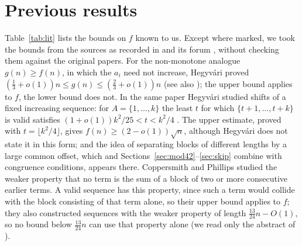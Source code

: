 \documentclass[11pt]{amsart}
\theoremstyle{remark}
\begin{document}
\section{Previous results}\label{sec:previous}

Table~\ref{tab:lit} lists the bounds on $f$ known to us. Except where marked, we took the bounds from the sources as recorded in
\cite{EP357} and its forum \cite{EP357forum}, without checking them against the original papers. For the non-monotone analogue
$g(n)\ge f(n)$, in which the $a_i$ need not increase, Hegyv\'ari \cite[Theorem~1]{Hegyvari1986} proved
$(\frac13+o(1))n\le g(n)\le(\frac23+o(1))n$ (see also \cite{Beker2024,Konieczny2021}); the upper bound applies to $f$, the lower bound
does not. In the same paper Hegyv\'ari studied shifts of a fixed increasing sequence: for $A=\{1,\dots,k\}$ the least $t$ for which
$\{t+1,\dots,t+k\}$ is valid satisfies $(1+o(1))k^2/25<t<k^2/4$ \cite[Theorem~2]{Hegyvari1986}. The upper estimate, proved with
$t=\lfloor k^2/4\rfloor$, gives $f(n)\ge(2-o(1))\sqrt n$, although Hegyv\'ari does not state it in this form; and the idea of separating
blocks of different lengths by a large common offset, which \cite{Pickhardt2026} and Sections~\ref{sec:mod42}--\ref{sec:skip} combine
with congruence conditions, appears there. Coppersmith and Phillips \cite{CoppersmithPhillips1996} studied the weaker property that no term
is the sum of a block of two or more consecutive earlier terms. A valid sequence has this property, since such a term would collide with the
block consisting of that term alone, so their upper bound applies to $f$; they also constructed sequences with the weaker property of length
$\frac{13}{24}n-O(1)$, so no bound below $\frac{13}{24}n$ can use that property alone (we read only the abstract of
\cite{CoppersmithPhillips1996}).
\end{document}
